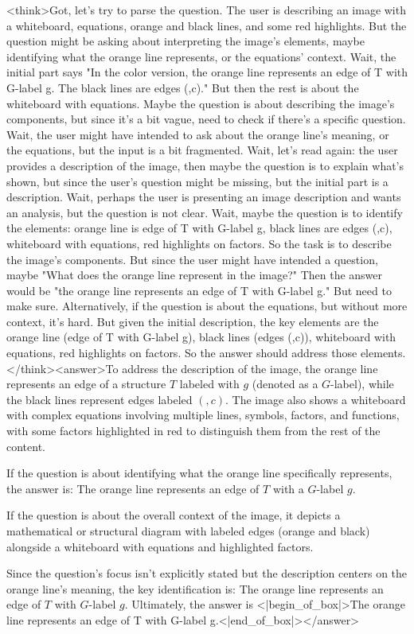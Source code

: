 <think>Got, let's try to parse the question. The user is describing an image with a whiteboard, equations, orange and black lines, and some red highlights. But the question might be asking about interpreting the image's elements, maybe identifying what the orange line represents, or the equations' context. Wait, the initial part says "In the color version, the orange line represents an edge of T with G-label g. The black lines are edges (,c)." But then the rest is about the whiteboard with equations. Maybe the question is about describing the image's components, but since it's a bit vague, need to check if there's a specific question. Wait, the user might have intended to ask about the orange line's meaning, or the equations, but the input is a bit fragmented. Wait, let's read again: the user provides a description of the image, then maybe the question is to explain what's shown, but since the user's question might be missing, but the initial part is a description. Wait, perhaps the user is presenting an image description and wants an analysis, but the question is not clear. Wait, maybe the question is to identify the elements: orange line is edge of T with G-label g, black lines are edges (,c), whiteboard with equations, red highlights on factors. So the task is to describe the image's components. But since the user might have intended a question, maybe "What does the orange line represent in the image?" Then the answer would be "the orange line represents an edge of T with G-label g." But need to make sure. Alternatively, if the question is about the equations, but without more context, it's hard. But given the initial description, the key elements are the orange line (edge of T with G-label g), black lines (edges (,c)), whiteboard with equations, red highlights on factors. So the answer should address those elements.</think><answer>To address the description of the image, the orange line represents an edge of a structure \( T \) labeled with \( g \) (denoted as a \( G \)-label), while the black lines represent edges labeled \( (,c) \). The image also shows a whiteboard with complex equations involving multiple lines, symbols, factors, and functions, with some factors highlighted in red to distinguish them from the rest of the content.  

If the question is about identifying what the orange line specifically represents, the answer is:  
The orange line represents an edge of \( T \) with a \( G \)-label \( g \).  

If the question is about the overall context of the image, it depicts a mathematical or structural diagram with labeled edges (orange and black) alongside a whiteboard with equations and highlighted factors.  

Since the question’s focus isn’t explicitly stated but the description centers on the orange line’s meaning, the key identification is:  
The orange line represents an edge of \( T \) with \( G \)-label \( g \).  
Ultimately, the answer is <|begin_of_box|>The orange line represents an edge of T with G-label g.<|end_of_box|></answer>